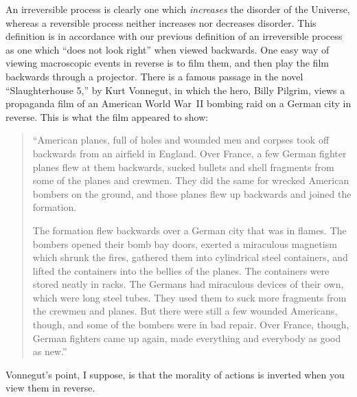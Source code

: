 An irreversible process is clearly one which {\em increases}\/ the disorder of the
Universe, whereas a reversible process neither increases nor decreases disorder. 
This definition is in accordance with our previous definition of an
irreversible process as one which ``does not look right'' when viewed backwards.
One easy way of viewing macroscopic events in reverse is to film them, and then
play the film backwards through a projector. There is a famous passage in the
novel ``Slaughterhouse 5,'' by Kurt Vonnegut, in which the hero, Billy Pilgrim, views
a propaganda film of an American World War~II bombing raid on a German city
in reverse. This is what the film appeared to show:
\begin{quote}
{\sf  ``American planes, full of holes and wounded men and corpses took off backwards
from an airfield in England. Over France, a few German fighter planes flew at them
backwards, sucked bullets and shell fragments from some of the planes and crewmen. 
They did the same for wrecked American bombers on the ground, and those planes flew
up backwards and joined the formation.

The formation flew backwards over a German city that was in flames. The bombers
opened their bomb bay doors, exerted a miraculous magnetism which shrunk the fires,
gathered them into cylindrical steel containers, and lifted the containers into the
bellies of the planes. The containers were stored neatly in racks. The Germans
had miraculous devices of their own, which were long steel tubes. They used them
to suck more fragments from the crewmen and planes. But there were still a few wounded
Americans, though, and some of the bombers were in bad repair. Over France, though,
German fighters came up again, made everything and everybody as good as new.''}
\end{quote}
Vonnegut's point, I suppose, is that the morality of actions is inverted when you
view them in reverse. 



